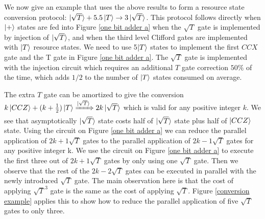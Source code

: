 \documentclass[12pt]{dalthesis}
\begin{document}
We now give an example that uses the above results to form a resource state conversion protocol: $\ket{\sqrt{T}} + 5.5\ket{T} \rightarrow 3\ket{\sqrt{T}}$. This protocol follows directly when $\ket{+}$ states are fed into Figure \ref{one bit adder a} when the $\sqrt{T}$ gate is implemented by injection of $\ket{\sqrt{T}}$, and when the third level Clifford gates are implemented with $\ket{T}$ resource states. We need to use 5$\ket{T}$ states to implement the first $CCX$ gate and the T gate in Figure \ref{one bit adder a}. The $\sqrt{T}$ gate is implemented with the injection circuit which requires an additional $T$ gate correction $50\%$ of the time, which adds $1/2$ to the number of $\ket{T}$ states consumed on average.

The extra $T$ gate can be amortized to give the conversion $k\ket{CCZ} + (k+ \frac{1}{2})\ket{T} \xRightarrow{\ket{\sqrt{T}}} 2k\ket{\sqrt{T}}$ which is valid for any positive integer $k$. We see that asymptotically $\ket{\sqrt{T}}$ state costs half of $\ket{\sqrt{T}}$ state plus half of $\ket{CCZ}$ state. Using the circuit on Figure \ref{one bit adder a} we can reduce the parallel application of $2k+1 \sqrt{T}$ gates to the parallel application of $2k-1 \sqrt{T}$ gates for any positive integer k. We use the circuit on Figure \ref{one bit adder a} to execute the first three out of $2k+1 \sqrt{T}$ gates by only using one $\sqrt{T}$ gate. Then we observe that the rest of the $2k-2 \sqrt{T}$ gates can be executed in parallel with the newly introduced $\sqrt{T}$ gate. The main observation here is that the cost of applying $\sqrt{T}^3$ gate is the same as the cost of applying $\sqrt{T}$. Figure \ref{conversion example} applies this to show how to reduce the parallel application of five $\sqrt{T}$ gates to only three.
\end{document}
